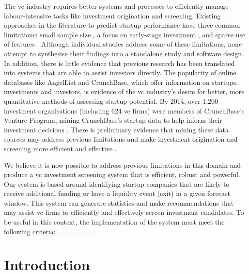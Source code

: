 \documentclass[../thesis/thesis.tex]{subfiles}
\begin{document}
The \gls{vc} industry requires better systems and processes to efficiently manage labour-intensive tasks like investment origination and screening. Existing approaches in the literature to predict startup performance have three common limitations: small sample size \cite{ahlers2015, gimmon2010, dixon2014, hoenen2014, yu2015, an2015, werth2013, croce2016}, a focus on early-stage investment \cite{beckwith2016, ahlers2015, cheng2016, yuan2016, croce2016, stone2014}, and sparse use of features \cite{ahlers2015, an2015, cheng2016, croce2016, werth2013, gimmon2010}. Although individual studies address some of these limitations, none attempt to synthesise their findings into a standalone study and software design. In addition, there is little evidence that previous research has been translated into systems that are able to assist investors directly. The popularity of online databases like AngelList and CrunchBase, which offer information on startups, investments and investors, is evidence of the \gls{vc} industry’s desire for better, more quantitative methods of assessing startup potential. By 2014, over 1,200 investment organisations (including 624 \gls{vc} firms) were members of CrunchBase's Venture Program, mining CrunchBase's startup data to help inform their investment decisions \cite{patil2015}. There is preliminary evidence that mining these data sources may address previous limitations and make investment origination and screening more efficient and effective \cite{stone2014,bhat2011}.

We believe it is now possible to address previous limitations in this domain and produce a \gls{vc} investment screening system that is efficient, robust and powerful. Our system is based around identifying startup companies that are likely to receive additional funding or have a liquidity event (exit) in a given forecast window. This system can generate statistics and make recommendations that may assist \gls{vc} firms to efficiently and effectively screen investment candidates. To be useful in this context, the implementation of the system must meet the following criteria:
=======
 \chapter{Introduction}
\end{document}
